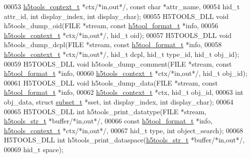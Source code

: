 \begin{DoxyCode}
00053                             \hyperlink{structh5tools__context__t}{h5tools\_context\_t} *ctx\textcolor{comment}{/*in,out*/}, \textcolor{keyword}{const} \textcolor{keywordtype}{char} *attr\_name, 
00054                             hid\_t attr\_id, \textcolor{keywordtype}{int} display\_index, \textcolor{keywordtype}{int} display\_char);
00055 H5TOOLS\_DLL \textcolor{keywordtype}{void}    h5tools\_dump\_oid(FILE *stream, \textcolor{keyword}{const} \hyperlink{structh5tool__format__t}{h5tool\_format\_t} *info,
00056                             \hyperlink{structh5tools__context__t}{h5tools\_context\_t} *ctx\textcolor{comment}{/*in,out*/}, hid\_t oid);
00057 H5TOOLS\_DLL \textcolor{keywordtype}{void}    h5tools\_dump\_dcpl(FILE *stream, \textcolor{keyword}{const} \hyperlink{structh5tool__format__t}{h5tool\_format\_t} *info,
00058                             \hyperlink{structh5tools__context__t}{h5tools\_context\_t} *ctx\textcolor{comment}{/*in,out*/}, hid\_t dcpl, hid\_t type\_id, 
      hid\_t obj\_id);
00059 H5TOOLS\_DLL \textcolor{keywordtype}{void}    h5tools\_dump\_comment(FILE *stream, \textcolor{keyword}{const} \hyperlink{structh5tool__format__t}{h5tool\_format\_t} *info,
00060                             \hyperlink{structh5tools__context__t}{h5tools\_context\_t} *ctx\textcolor{comment}{/*in,out*/}, hid\_t obj\_id);
00061 H5TOOLS\_DLL \textcolor{keywordtype}{void}    h5tools\_dump\_data(FILE *stream, \textcolor{keyword}{const} \hyperlink{structh5tool__format__t}{h5tool\_format\_t} *info,
00062                             \hyperlink{structh5tools__context__t}{h5tools\_context\_t} *ctx, hid\_t obj\_id,
00063                             \textcolor{keywordtype}{int} obj\_data, \textcolor{keyword}{struct} \hyperlink{structsubset__t}{subset\_t} *sset, \textcolor{keywordtype}{int} display\_index, \textcolor{keywordtype}{int} 
      display\_char);
00064 
00065 H5TOOLS\_DLL \textcolor{keywordtype}{int}     h5tools\_print\_datatype(FILE *stream, \hyperlink{structh5tools__str__t}{h5tools\_str\_t} *buffer\textcolor{comment}{/*in,out*/},
00066                             \textcolor{keyword}{const} \hyperlink{structh5tool__format__t}{h5tool\_format\_t} *info, 
      \hyperlink{structh5tools__context__t}{h5tools\_context\_t} *ctx\textcolor{comment}{/*in,out*/},
00067                             hid\_t type, \textcolor{keywordtype}{int} object\_search);
00068 H5TOOLS\_DLL \textcolor{keywordtype}{int}     h5tools\_print\_dataspace(\hyperlink{structh5tools__str__t}{h5tools\_str\_t} *buffer\textcolor{comment}{/*in,out*/},
00069                             hid\_t space);

\end{DoxyCode}
